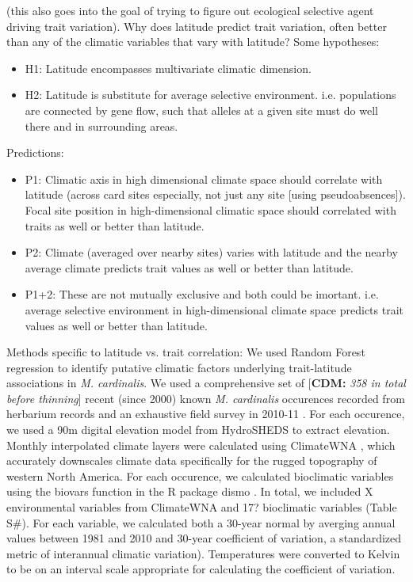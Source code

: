 \documentclass[11pt, oneside]{article}\usepackage[]{graphicx}\usepackage[]{color}
\newcommand{\pkg}[1]{{\fontseries{b}\selectfont #1}}
\newcommand{\cdm}[1]{{ \color{magenta} [{\bf{CDM:}} {\em#1}]}} %
\begin{document}
(this also goes into the goal of trying to figure out ecological selective agent driving trait variation). Why does latitude predict trait variation, often better than any of the climatic variables that vary with latitude? Some hypotheses:
\begin{itemize}
  \item{H1: Latitude encompasses multivariate climatic dimension.}
  \item{H2: Latitude is substitute for average selective environment. i.e. populations are connected by gene flow, such that alleles at a given site must do well there and in surrounding areas.}
\end{itemize}

Predictions:
\begin{itemize}
  \item{P1: Climatic axis in high dimensional climate space should correlate with latitude (across card sites especially, not just any site [using pseudoabsences]). Focal site position in high-dimensional climatic space should correlated with traits as well or better than latitude.}
  \item{P2: Climate (averaged over nearby sites) varies with latitude and the nearby average climate predicts trait values as well or better than latitude.}
  \item{P1+2: These are not mutually exclusive and both could be imortant. i.e. average selective environment in high-dimensional climate space predicts trait values as well or better than latitude.}
\end{itemize}

Methods specific to latitude vs. trait correlation:
We used Random Forest regression \citep{Liaw_Wiener_2002} to identify putative climatic factors underlying trait-latitude associations in \textit{M. cardinalis}. We used a comprehensive set of \cdm{358 in total before thinning} recent (since 2000) known \textit{M. cardinalis} occurences recorded from herbarium records and an exhaustive field survey in 2010-11 \citep{Angert_ENM}. For each occurence, we used a 90m digital elevation model from HydroSHEDS \citep{Lehner_etal_2006} to extract elevation. Monthly interpolated climate layers were calculated using ClimateWNA \citep{Wang_etal_2012}, which accurately downscales climate data specifically for the rugged topography of western North America. For each occurence, we calculated bioclimatic variables using the biovars function in the R package \pkg{dismo} \citep{Hijmans_etal_2014}. In total, we included X environmental variables from ClimateWNA and 17? bioclimatic variables (Table S\#). For each variable, we calculated both a 30-year normal by averging annual values between 1981 and 2010 and 30-year coefficient of variation, a standardized metric of interannual climatic variation). Temperatures were converted to Kelvin to be on an interval scale appropriate for calculating the coefficient of variation. 
\end{document}
